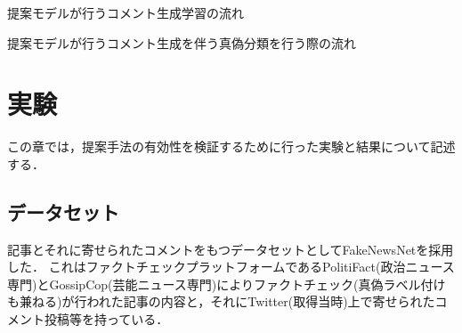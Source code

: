 \begin{algorithm}[p]
    \caption{提案モデルが行うコメント生成学習の流れ}
    \label{alg:generate}
    \begin{algorithmic}[1]
                \EndIf
                    \EndIf
                \EndFor
            \EndFor
        \EndProcedure

                    \EndWhile
                \EndFor
            \EndFor
        \EndProcedure
    \end{algorithmic}
\end{algorithm}

\begin{algorithm}
    \caption{提案モデルが行うコメント生成を伴う真偽分類を行う際の流れ}
    \label{alg:classify}
    \begin{algorithmic}[1]
            \EndFor
        \EndProcedure
    \end{algorithmic}
\end{algorithm}


\section{実験}\label{sec:gen_exp}
この章では，提案手法の有効性を検証するために行った実験と結果について記述する．

\subsection{データセット}
\label{sec:dataset}
記事とそれに寄せられたコメントをもつデータセットとしてFakeNewsNet\cite{Shu2018FakeNewsNetAD}を採用した．
これはファクトチェックプラットフォームであるPolitiFact(政治ニュース専門)とGossipCop(芸能ニュース専門)によりファクトチェック(真偽ラベル付けも兼ねる)が行われた記事の内容と，それにTwitter(取得当時)上で寄せられたコメント投稿等を持っている．

